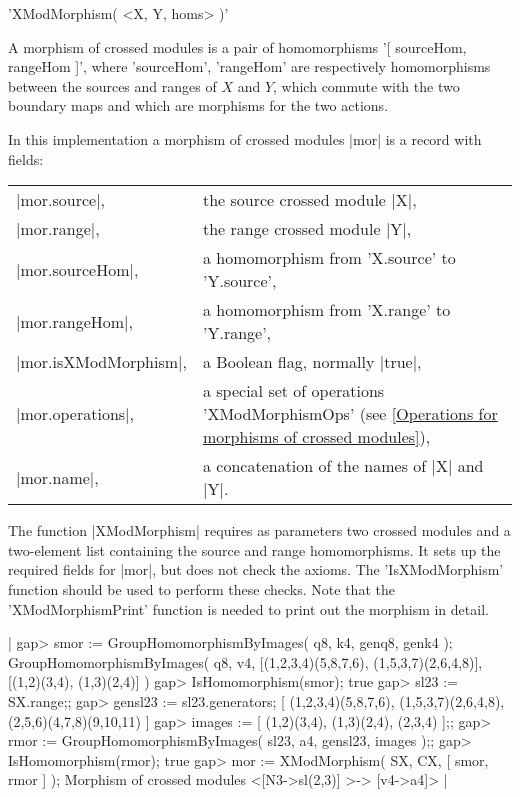 'XModMorphism( <X, Y, homs> )'

A morphism of crossed modules is a pair of homomorphisms '[ sourceHom,
rangeHom    ]',   where   'sourceHom',   'rangeHom' are   respectively
homomorphisms  between  the sources and ranges  of  $X$ and $Y$, which
commute with the two boundary maps and which are morphisms for the two
actions.

In this implementation a morphism of crossed modules |mor| is a record
with fields:

\begin{tabular}{ll}
|mor.source|,         & the source crossed module  |X|,                \\
|mor.range|,          & the range crossed module  |Y|,                 \\
|mor.sourceHom|,      & a homomorphism from 'X.source' to 'Y.source',  \\
|mor.rangeHom|,       & a homomorphism from 'X.range' to 'Y.range',    \\
|mor.isXModMorphism|, & a Boolean flag, normally |true|,               \\
|mor.operations|,     & a special set of operations 'XModMorphismOps'
              (see \ref{Operations for morphisms of crossed modules}), \\
|mor.name|,           & a concatenation of the names of |X| and |Y|.
\end{tabular}

The function |XModMorphism| requires as parameters two crossed modules
and a two-element list containing the  source and range homomorphisms.
It  sets  up the  required  fields for |mor|,   but does not check the
axioms.  The 'IsXModMorphism' function should be used to perform these
checks.  Note that the 'XModMorphismPrint' function is needed to print
out the morphism in detail.

|    gap> smor := GroupHomomorphismByImages( q8, k4, genq8, genk4 );
    GroupHomomorphismByImages( q8, v4, 
     [(1,2,3,4)(5,8,7,6), (1,5,3,7)(2,6,4,8)], [(1,2)(3,4), (1,3)(2,4)] )
    gap> IsHomomorphism(smor);
    true
    gap> sl23 := SX.range;;
    gap> gensl23 := sl23.generators;
     [ (1,2,3,4)(5,8,7,6), (1,5,3,7)(2,6,4,8), (2,5,6)(4,7,8)(9,10,11) ]
    gap> images := [ (1,2)(3,4), (1,3)(2,4), (2,3,4) ];;
    gap> rmor := GroupHomomorphismByImages( sl23, a4, gensl23, images );;
    gap> IsHomomorphism(rmor);
    true
    gap> mor := XModMorphism( SX, CX, [ smor, rmor ] );
    Morphism of crossed modules <[N3->sl(2,3)] >-> [v4->a4]> |

